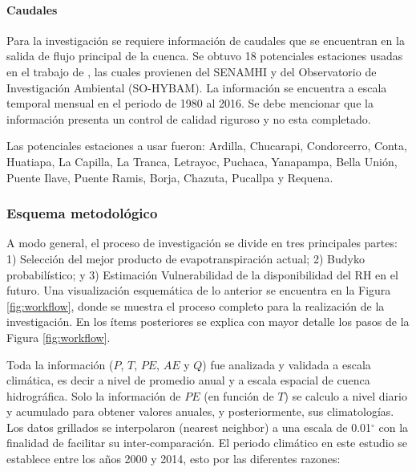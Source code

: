 \documentclass[12pt]{article}
\begin{document}


\paragraph{Caudales}\mbox{}

Para la investigación se requiere información de caudales que se encuentran en la salida de flujo principal de la cuenca. Se obtuvo 18 potenciales estaciones usadas en el trabajo de \citet{Aybar2019}, las cuales provienen del SENAMHI y del Observatorio de Investigación Ambiental (SO-HYBAM). La información se encuentra a escala temporal mensual en el periodo de 1980 al 2016. Se debe mencionar que la información presenta un control de calidad riguroso y no esta completado.

Las potenciales estaciones a usar fueron: Ardilla, Chucarapi, Condorcerro, Conta, Huatiapa, La Capilla, La Tranca, Letrayoc, Puchaca, Yanapampa, Bella Unión, Puente Ilave, Puente Ramis, Borja, Chazuta, Pucallpa y Requena.

\subsubsection{Esquema metodológico}

A modo general, el proceso de investigación se divide en tres principales partes: 1) Selección del mejor producto de evapotranspiración actual; 2) Budyko probabilístico; y 3) Estimación Vulnerabilidad de la disponibilidad del RH en el futuro. Una visualización esquemática de lo anterior se encuentra en la Figura \ref{fig:workflow}, donde se muestra el proceso completo para la realización de la investigación. En los ítems posteriores se explica con mayor detalle los pasos de la Figura \ref{fig:workflow}.



Toda la información ($P$, $T$, $PE$, $AE$ y $Q$) fue analizada y validada a escala climática, es decir a nivel de promedio anual y a escala espacial de cuenca hidrográfica. Solo la información de $PE$ (en función de $T$) se calculo a nivel diario y acumulado para obtener valores anuales, y posteriormente, sus climatologías. Los datos grillados se interpolaron (nearest neighbor) a una escala de 0.01$^{\circ}$ con la finalidad de facilitar su inter-comparación. El periodo climático en este estudio se establece entre los años 2000 y 2014, esto por las diferentes razones:
\end{document}

